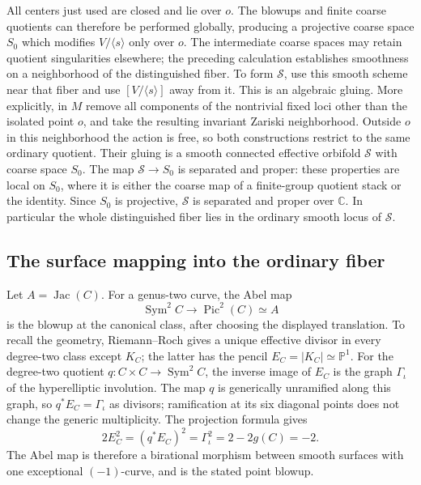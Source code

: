 \documentclass[11pt,reqno]{amsart}
\numberwithin{equation}{section}
\theoremstyle{definition}
\theoremstyle{remark}
\begin{document}
All centers just used are closed and lie over $o$.  The blowups and
finite coarse quotients can therefore be performed globally,
producing a projective coarse space $S_0$ which modifies
$V/\langle s\rangle$ only over $o$.  The intermediate coarse spaces
may retain quotient singularities elsewhere; the preceding calculation
establishes smoothness on a neighborhood of the distinguished fiber.
To form $\mathcal S$, use this smooth scheme near that fiber and use
$[V/\langle s\rangle]$ away from it.  This is an algebraic gluing.
More explicitly, in $M$ remove all components of the nontrivial fixed
loci other than the isolated point $o$, and take the resulting invariant
Zariski neighborhood.  Outside $o$ in this neighborhood the action is
free, so both constructions restrict to the same ordinary quotient.
Their gluing is a smooth connected effective orbifold $\mathcal S$ with
coarse space $S_0$.  The map $\mathcal S\to S_0$ is separated and proper:
these properties are local on $S_0$, where it is either the coarse map of a finite-group
quotient stack or the identity.  Since $S_0$ is projective,
$\mathcal S$ is separated and proper over $\mathbb C$.  In particular the whole distinguished
fiber lies in the ordinary smooth locus of $\mathcal S$.

\subsection{The surface mapping into the ordinary fiber}\label{geo:surface}

Let $A=\operatorname{Jac}(C)$.  For a genus-two curve, the Abel map
\[
        \operatorname{Sym}^2C\longrightarrow\operatorname{Pic}^2(C)\simeq A
\]
is the blowup at the canonical class, after choosing the displayed
translation.  To recall the geometry, Riemann--Roch gives a unique
effective divisor in every degree-two class except $K_C$; the latter
has the pencil $E_C=|K_C|\simeq\mathbb P^1$.  For the degree-two quotient
$q:C\times C\to\operatorname{Sym}^2 C$, the inverse image of $E_C$ is the graph
$\Gamma_\iota$ of the hyperelliptic involution.  The map $q$ is generically
unramified along this graph, so $q^*E_C=\Gamma_\iota$ as divisors;
ramification at its six diagonal points does not change the generic
multiplicity.  The projection formula gives
\[
  2E_C^2=(q^*E_C)^2=\Gamma_\iota^2=2-2g(C)=-2.
\]
The Abel map is therefore a birational
morphism between smooth surfaces with one exceptional $(-1)$-curve,
and is the stated point blowup.
\end{document}
